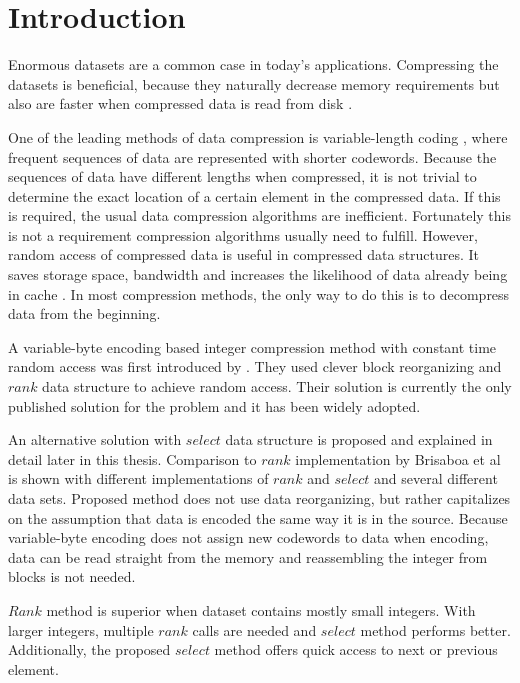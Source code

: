 \chapter{Introduction}
Enormous datasets are a common case in today's applications. Compressing the datasets is beneficial, because they 
naturally decrease memory requirements but also are faster when compressed data is read from disk \citep{Zob95}. 

One of the leading methods of data compression is variable-length coding \citep{Sal99}, where frequent sequences of data
are represented with shorter codewords. Because the sequences of data have different lengths when compressed, it is 
not trivial to determine the exact location of a certain element in the compressed data. If this is required, the usual 
data compression algorithms are inefficient. Fortunately this is not a requirement compression algorithms usually need to fulfill. However, 
random access of compressed data is useful in compressed data structures. It saves storage space, bandwidth and increases the likelihood
of data already being in cache \citep{Sch02}. In most compression methods, the only way to do this is to decompress data from the beginning. 

A variable-byte encoding based integer compression method with constant time random access was first introduced by \citep{Bri09}. They used clever block 
reorganizing and $rank$ data structure to achieve random access. Their solution is currently the only published solution for the problem and it 
has been widely adopted. 

An alternative solution with $select$ data structure is proposed and explained in detail later in this thesis. Comparison to $rank$ implementation by Brisaboa et al is 
shown with different implementations of $rank$ and $select$ and several different data sets. Proposed method does not use data 
reorganizing, but rather capitalizes on the assumption that data is encoded the same way it is in the source. Because variable-byte encoding does not assign 
new codewords to data when encoding, data can be read straight from the memory and reassembling the integer from blocks is not needed.

$Rank$ method is superior when dataset contains mostly small integers. With larger integers, multiple $rank$ calls are needed and $select$ method performs better. Additionally, the
proposed $select$ method offers quick access to next or previous element.




